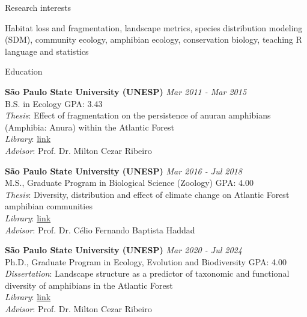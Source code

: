 \documentclass{resume}
\begin{document}

\begin{rSection}{Research interests}

Habitat loss and fragmentation, landscape metrics, species distribution modeling (SDM), community ecology, amphibian ecology, conservation biology, teaching R language and statistics

\end{rSection}


\begin{rSection}{Education}

{\bf São Paulo State University (UNESP)} \hfill {\em Mar 2011 - Mar 2015}\\
B.S. in Ecology\hfill { GPA: 3.43 }\\
{\it Thesis}: Effect of fragmentation on the persistence of anuran amphibians (Amphibia: Anura) within the Atlantic Forest\\
{\it Library}: \href{http://hdl.handle.net/11449/138991}{\underline{link}}\\
{\it Advisor}: Prof. Dr. Milton Cezar Ribeiro

{\bf São Paulo State University (UNESP)} \hfill {\em Mar 2016 - Jul 2018}\\
M.S., Graduate Program in Biological Science (Zoology)\hfill { GPA: 4.00 }\\
{\it Thesis}: Diversity, distribution and effect of climate change on Atlantic Forest amphibian communities\\
{\it Library}: \href{http://hdl.handle.net/11449/154993}{\underline{link}}\\
{\it Advisor}: Prof. Dr. Célio Fernando Baptista Haddad

{\bf São Paulo State University (UNESP)} \hfill {\em Mar 2020 - Jul 2024}\\
Ph.D., Graduate Program in Ecology, Evolution and Biodiversity \hfill { GPA: 4.00 }\\
{\it Dissertation}: Landscape structure as a predictor of taxonomic and functional diversity of amphibians in the Atlantic Forest\\
{\it Library}: \href{https://hdl.handle.net/11449/256726}{\underline{link}}\\
{\it Advisor}: Prof. Dr. Milton Cezar Ribeiro

\end{rSection}
\end{document}
